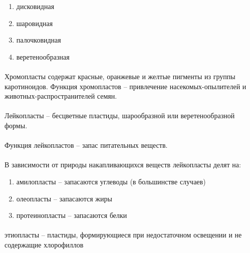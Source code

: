 \begin{enumerate}

	\item дисковидная
	\item шаровидная
	\item палочковидная
	\item веретенообразная

\end{enumerate}

\paragraph*{}Хромопласты содержат красные, оранжевые и желтые пигменты из группы каротиноидов. Функция хромопластов -- привлечение насекомых-опылителей и животных-распространителей семян.

\paragraph*{}Лейкопласты – бесцветные пластиды, шарообразной или веретенообразной формы. 

\paragraph*{}Функция лейкопластов -- запас питательных веществ. 


\paragraph*{}В зависимости от природы накапливающихся веществ лейкопласты делят на:

\begin{enumerate}

	\item амилопласты -- запасаются углеводы (в большинстве случаев)
	\item олеопласты -- запасаются жиры 
	\item протеинопласты -- запасаются белки

\end{enumerate}

\paragraph*{}этиопласты -- пластиды, формирующиеся при недостаточном освещении и не содержащие хлорофиллов

